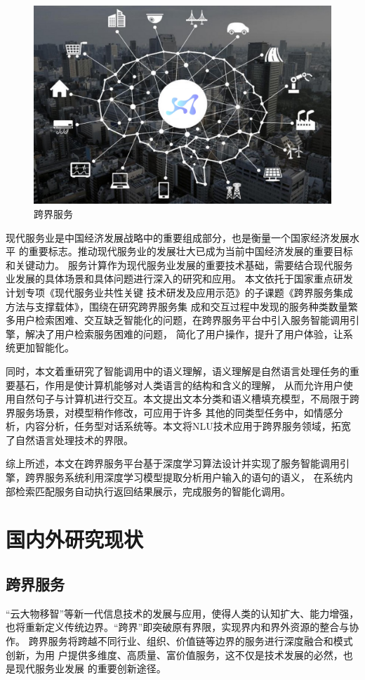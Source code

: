 \begin{figure}[htbp]
  \centering
  \includegraphics[scale=0.4]{./images/kuajiefuwu.png}
  \caption{跨界服务}
  \label{fig:kuajiefuwu}
\end{figure}


现代服务业是中国经济发展战略中的重要组成部分，也是衡量一个国家经济发展水平
的重要标志。推动现代服务业的发展壮大已成为当前中国经济发展的重要目标和关键动力。
服务计算作为现代服务业发展的重要技术基础，需要结合现代服务业发展的具体场景和具体问题进行深入的研究和应用。
本文依托于国家重点研发计划专项《现代服务业共性关键
技术研发及应用示范》的子课题《跨界服务集成方法与支撑载体》，围绕在研究跨界服务集
成和交互过程中发现的服务种类数量繁多用户检索困难、交互缺乏智能化的问题，在跨界服务平台中引入服务智能调用引擎，解决了用户检索服务困难的问题，
简化了用户操作，提升了用户体验，让系统更加智能化。

同时，本文着重研究了智能调用中的语义理解，语义理解是自然语言处理任务的重要基石，作用是使计算机能够对人类语言的结构和含义的理解，
从而允许用户使用自然句子与计算机进行交互。本文提出文本分类和语义槽填充模型，不局限于跨界服务场景，对模型稍作修改，可应用于许多
其他的同类型任务中，如情感分析，内容分析，任务型对话系统等。本文将NLU技术应用于跨界服务领域，拓宽了自然语言处理技术的界限。

综上所述，本文在跨界服务平台基于深度学习算法设计并实现了服务智能调用引擎，跨界服务系统利用深度学习模型提取分析用户输入的语句的语义，
在系统内部检索匹配服务自动执行返回结果展示，完成服务的智能化调用。

\section{国内外研究现状}
\subsection{跨界服务}
“云大物移智”等新一代信息技术的发展与应用，使得人类的认知扩大、能力增强，
也将重新定义传统边界。“跨界”即突破原有界限，实现界内和界外资源的整合与协作。
跨界服务将跨越不同行业、组织、价值链等边界的服务进行深度融合和模式创新，为用
户提供多维度、高质量、富价值服务，这不仅是技术发展的必然，也是现代服务业发展
的重要创新途径。

